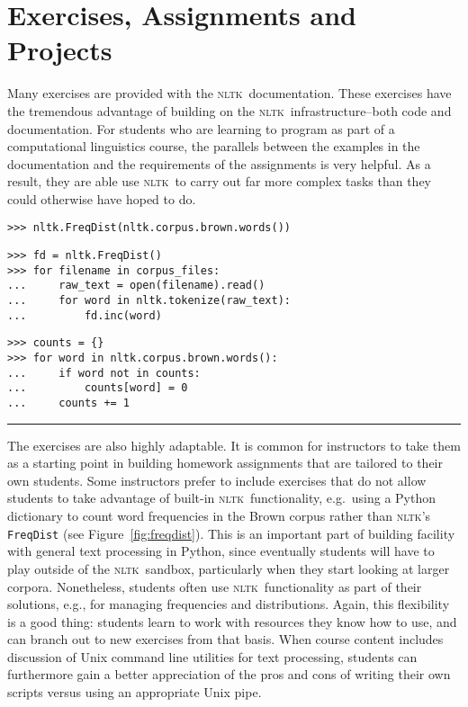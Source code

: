 \documentclass[11pt]{article}
\newcommand{\NLTK}{\textsc{nltk}}
\newcommand{\code}[1]{\texttt{\small #1}}
\begin{document}
\section{Exercises, Assignments and Projects}
\label{sec:projects}

Many exercises are provided with the \NLTK\ documentation. These
exercises have the tremendous advantage of building on the \NLTK\
infrastructure--both code and documentation. For students who are
learning to program as part of a computational linguistics course, the
parallels between the examples in the documentation and the
requirements of the assignments is very helpful. As a result, they
are able use \NLTK\ to carry out far more complex tasks than they could
otherwise have hoped to do. %


\begin{figure*}
{\small
\begin{verbatim}
>>> nltk.FreqDist(nltk.corpus.brown.words())
\end{verbatim}}
\medskip

{\small
\begin{verbatim}
>>> fd = nltk.FreqDist()
>>> for filename in corpus_files:
...     raw_text = open(filename).read()
...     for word in nltk.tokenize(raw_text):
...         fd.inc(word)
\end{verbatim}}
\medskip

{\small
\begin{verbatim}
>>> counts = {}
>>> for word in nltk.corpus.brown.words():
...     if word not in counts:
...         counts[word] = 0
...     counts += 1
\end{verbatim}}
\caption{Three Ways to Build up a Frequency Distribution of Words in the Brown Corpus}
\label{fig:freqdist}
\vspace*{1ex}
\hrule
\end{figure*}

The exercises are also highly adaptable. It is common for instructors
to take them as a starting point in building homework assignments that
are tailored to their own students.  Some instructors prefer to
include exercises that do not allow students to take advantage of
built-in \NLTK\ functionality, e.g.\  using a Python dictionary to
count word frequencies in the Brown corpus rather than \NLTK 's
\code{FreqDist} (see Figure~\ref{fig:freqdist}).  This is an important
part of building facility with general text processing in Python,
since eventually students will have to play outside of the \NLTK\
sandbox, particularly when they start looking at larger
corpora. Nonetheless, students often use \NLTK\ functionality as part
of their solutions, e.g., for managing frequencies and
distributions. Again, this flexibility is a good thing: students learn
to work with resources they know how to use, and can branch out to new
exercises from that basis. When course content includes discussion of
Unix command line utilities for text processing, students can
furthermore gain a better appreciation of the pros and cons of writing
their own scripts versus using an appropriate Unix pipe.
\end{document}
